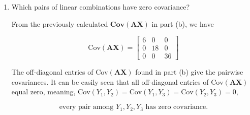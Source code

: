 \documentclass[12pt]{article}
\begin{document}
\begin{enumerate}
Therefore the variances are,

$$
\boxed{
\text{Cov}(Y_1,Y_2) = 0, \hspace{1em} \text{Cov}(Y_1,Y_3) = 0 \text{Cov}(Y_2,Y_3) = 0
}
$$


$$
\boxed{
\mathbf{Var(Y_1) = 6}, \hspace{1em} \mathbf{Var(Y_2) = 18}, \hspace{1em} \mathbf{Var(Y_3) = 36}
}
$$
\item[(c)] Which pairs of linear combinations have zero covariance?

\vspace{0.5em}

\noindent From the previously calculated $\mathbf{Cov(AX)}$ in part (b), we have

$$
\text{Cov}(\mathbf{A}\mathbf{X}) = \begin{bmatrix} 6 & 0 & 0 \\ 0 & 18 & 0 \\ 0 & 0 & 36 \end{bmatrix}
$$

\noindent The off-diagonal entries of $\text{Cov}(\mathbf{A}\mathbf{X})$ found in part (b) give the pairwise covariances. It can be easily seen that all off-diagonal entries of $\text{Cov}(\mathbf{A}\mathbf{X})$ equal zero, meaning, $\text{Cov}(Y_1,Y_2) = \text{Cov}(Y_1,Y_3) = \text{Cov}(Y_2,Y_3) = 0$,

$$
\boxed{\text{every pair among } Y_1, Y_2, Y_3 \text{ has zero covariance.}}
$$

\end{enumerate}
\end{document}
